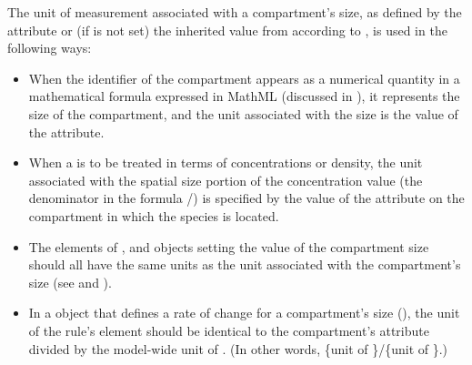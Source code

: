 The unit of measurement associated with a compartment's size, as
defined by the  attribute or (if  is not
set) the inherited value from \Model according to
, is used in the following ways:
\begin{itemize}

\item When the identifier of the compartment appears as a
  numerical quantity in a mathematical formula expressed in MathML
  (discussed in ), it represents the
  size of the compartment, and the unit associated with the size
  is the value of the  attribute.

\item When a \Species is to be treated in terms of concentrations
  or density, the unit associated with the spatial size portion of
  the concentration value (\ie the denominator in the
  formula /) is specified by the
  value of the  attribute on the compartment in which
  the species is located.

\item The  elements of \AssignmentRule,
  \InitialAssignment and \EventAssignment objects setting the
  value of the compartment size should all have the same units as
  the unit associated with the compartment's size (see
  and ).

\item In a \RateRule object that defines a rate of change for a
  compartment's size (), the unit of the
  rule's  element should be identical to the
  compartment's  attribute divided by the model-wide
  unit of .  (In other words, \{unit of
  \}/\{unit of \}.)

\end{itemize}


